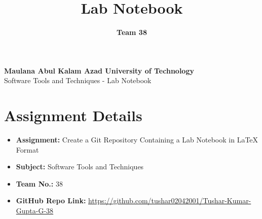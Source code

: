 \documentclass[a4paper,15pt]{article}
\title{\textbf{Lab Notebook}}
\author{\textbf{Team 38}}
\date{}
\begin{document}
\maketitle


\begin{center}
    \Large\textbf{Maulana Abul Kalam Azad University of Technology}\\
    \vspace{0.2cm}
    \large Software Tools and Techniques - Lab Notebook
\end{center}

\vspace{1cm}

\section*{Assignment Details}
\begin{itemize}[leftmargin=1.5cm]
    \item \textbf{Assignment:} Create a Git Repository Containing a Lab Notebook in LaTeX Format
    \item \textbf{Subject:} Software Tools and Techniques
    \item \textbf{Team No.:} 38
    \item \textbf{GitHub Repo Link:} \url{https://github.com/tushar02042001/Tushar-Kumar-Gupta-G-38}
\end{itemize}

\vspace{1cm}
\end{document}
